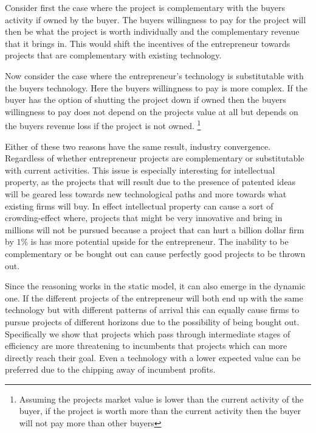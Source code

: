 \documentclass[11pt]{article}
\begin{document}

Consider first the case where the project is complementary with the buyers activity if owned by the buyer. The buyers willingness to pay for the project will then be what the project is worth individually and the complementary revenue that it brings in. This would shift the incentives of the entrepreneur towards projects that are complementary with existing technology. 

Now consider the case where the entrepreneur's technology is substitutable with the buyers technology. Here the buyers willingness to pay is more complex. If the buyer has the option of shutting the project down if owned then the buyers willingness to pay does not depend on the projects value at all but depends on the buyers revenue loss if the project is not owned. \footnote{Assuming the projects market value is lower than the current activity of the buyer, if the project is worth more than the current activity then the buyer will not pay more than other buyers}

Either of these two reasons have the same result, industry convergence. Regardless of whether entrepreneur projects are complementary or substitutable with current activities. This issue is especially interesting for intellectual property, as the projects that will result due to the presence of patented ideas will be geared less towards new technological paths and more towards what existing firms will buy. In effect intellectual property can cause a sort of crowding-effect where, projects that might be very innovative and bring in millions will not be pursued because a project that can hurt a billion dollar firm by $1\%$ is has more potential upside for the entrepreneur. The inability to be complementary or be bought out can cause perfectly good projects to be thrown out. 

Since the reasoning works in the static model, it can also emerge in the dynamic one. If the different projects of the entrepreneur will both end up with the same technology but with different patterns of arrival this can equally cause firms to pursue projects of different horizons due to the possibility of being bought out. Specifically we show that projects which pass through intermediate stages of efficiency are more threatening to incumbents that projects which can more directly reach their goal. Even a technology with a lower expected value can be preferred due to the chipping away of incumbent profits. 
\end{document}
